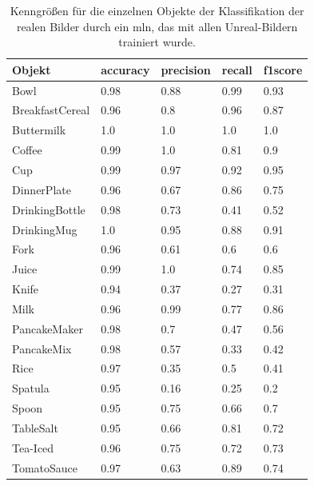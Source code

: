 \begin{table}
\begin{tabularx}{\textwidth}{Xllll}
\textbf{Objekt}	& \textbf{\gls{accuracy}} & \textbf{\gls{precision}}	& \textbf{\gls{recall}}	& \textbf{\gls{f1score}} \\ \hline
Bowl & 0.98 & 0.88 & 0.99 & 0.93 \\  
BreakfastCereal & 0.96 & 0.8 & 0.96 & 0.87 \\  
Buttermilk & 1.0 & 1.0 & 1.0 & 1.0 \\  
Coffee & 0.99 & 1.0 & 0.81 & 0.9 \\  
Cup & 0.99 & 0.97 & 0.92 & 0.95 \\  
DinnerPlate & 0.96 & 0.67 & 0.86 & 0.75 \\  
DrinkingBottle & 0.98 & 0.73 & 0.41 & 0.52 \\  
DrinkingMug & 1.0 & 0.95 & 0.88 & 0.91 \\  
Fork & 0.96 & 0.61 & 0.6 & 0.6 \\  
Juice & 0.99 & 1.0 & 0.74 & 0.85 \\  
Knife & 0.94 & 0.37 & 0.27 & 0.31 \\  
Milk & 0.96 & 0.99 & 0.77 & 0.86 \\  
PancakeMaker & 0.98 & 0.7 & 0.47 & 0.56 \\  
PancakeMix & 0.98 & 0.57 & 0.33 & 0.42 \\  
Rice & 0.97 & 0.35 & 0.5 & 0.41 \\  
Spatula & 0.95 & 0.16 & 0.25 & 0.2 \\  
Spoon & 0.95 & 0.75 & 0.66 & 0.7 \\  
TableSalt & 0.95 & 0.66 & 0.81 & 0.72 \\  
Tea-Iced & 0.96 & 0.75 & 0.72 & 0.73 \\  
TomatoSauce & 0.97 & 0.63 & 0.89 & 0.74 \\  
\end{tabularx}
\caption[Objekt-spezifische Kenngrößen der Klassifikation mit Unreal-Trainingsset und Real-Testset]{Kenngrößen für die einzelnen Objekte der Klassifikation der realen Bilder durch ein \gls{mln}, das mit allen Unreal-Bildern trainiert wurde.}
\label{tab:unreal_1_classMetrics}
\end{table}